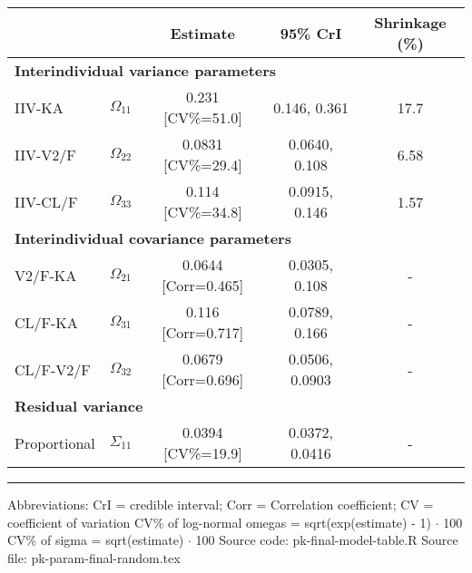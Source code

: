\setlength{\tabcolsep}{5pt} 
\begin{threeparttable}
\renewcommand{\arraystretch}{1.3}
\begin{tabular}[h]{lcccc}
\hline
 &  & Estimate & 95\% CrI & Shrinkage (\%) \\
\hline
\multicolumn{5}{l}{\textbf{Interindividual variance parameters}}\\%
IIV-KA & $\Omega_{11}$ & 0.231 [CV\%=51.0] & 0.146, 0.361 & 17.7 \\
IIV-V2/F & $\Omega_{22}$ & 0.0831 [CV\%=29.4] & 0.0640, 0.108 & 6.58 \\
IIV-CL/F & $\Omega_{33}$ & 0.114 [CV\%=34.8] & 0.0915, 0.146 & 1.57 \\
\hline \multicolumn{5}{l}{\textbf{Interindividual covariance parameters}}\\%
V2/F-KA & $\Omega_{21}$ & 0.0644 [Corr=0.465] & 0.0305, 0.108 & - \\
CL/F-KA & $\Omega_{31}$ & 0.116 [Corr=0.717] & 0.0789, 0.166 & - \\
CL/F-V2/F & $\Omega_{32}$ & 0.0679 [Corr=0.696] & 0.0506, 0.0903 & - \\
\hline \multicolumn{5}{l}{\textbf{Residual variance}}\\%
Proportional & $\Sigma_{11}$ & 0.0394 [CV\%=19.9] & 0.0372, 0.0416 & - \\
\hline
\end{tabular}
\end{threeparttable}
 
\vspace{0.67cm}
 
\begin{minipage}{1\linewidth}
\linespread{1.1}\selectfont
\rule{1\linewidth}{0.4pt}
\vspace{0.02cm}
Abbreviations: CrI = credible interval; 
                        Corr = Correlation coefficient;
                        CV = coefficient of variation \newline
CV\% of log-normal omegas = sqrt(exp(estimate) - 1) $\cdot$ 100 \newline
CV\% of sigma = sqrt(estimate) $\cdot$ 100 \newline
Source code: pk-final-model-table.R \newline
Source file: pk-param-final-random.tex \newline
\end{minipage}
